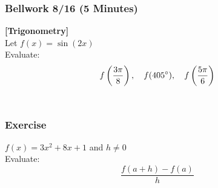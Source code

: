 \documentclass[12pt]{beamer}
\begin{document}
\begin{frame}
	\frametitle{Bellwork 8/16 (5 Minutes)}
	\initclock
	\textbf{[Trigonometry]}\vspace{.2cm}\\
	\vspace*{\fill}
	Let $f(x) = \sin(2x)$\\
	\vspace*{\fill}
	Evaluate: \[f\left(\frac{3\pi}{8}\right),\quad f(405\degree),\quad f\left(\frac{5\pi}{6}\right)\]\\
	\vspace*{\fill}
	\vspace*{\fill}
	\vspace*{\fill}
	\vspace*{\fill}
	\vspace*{\fill}
	\vspace*{\fill}
	\crono
\end{frame}
\begin{frame}
	\frametitle{Exercise}
	\vspace*{\fill}
	\vspace*{\fill}
	\initclock
	$f(x) = 3x^2+8x+1$ and $h\neq0$\\
	\vspace*{\fill}
	\vspace*{\fill}
	Evaluate: \[\frac{f(a+h)-f(a)}{h}\]\\
	\vspace*{\fill}
	\vspace*{\fill}
	\vspace*{\fill}
	\vspace*{\fill}
	\crono
\end{frame}
\end{document}
